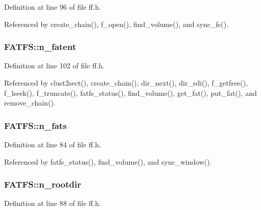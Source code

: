 Definition at line 96 of file ff.\-h.



Referenced by create\-\_\-chain(), f\-\_\-open(), find\-\_\-volume(), and sync\-\_\-fs().

\hypertarget{structFATFS_a8da50eeba6469bc20d60ca0cf9a1307c}{
\subsubsection[{n\-\_\-fatent}]{ F\-A\-T\-F\-S\-::n\-\_\-fatent}}\label{structFATFS_a8da50eeba6469bc20d60ca0cf9a1307c}


Definition at line 102 of file ff.\-h.



Referenced by clust2sect(), create\-\_\-chain(), dir\-\_\-next(), dir\-\_\-sdi(), f\-\_\-getfree(), f\-\_\-lseek(), f\-\_\-truncate(), fatfs\-\_\-status(), find\-\_\-volume(), get\-\_\-fat(), put\-\_\-fat(), and remove\-\_\-chain().

\hypertarget{structFATFS_a56716c7e7ac10cf46e73ffb2a2e9b545}{
\subsubsection[{n\-\_\-fats}]{ F\-A\-T\-F\-S\-::n\-\_\-fats}}\label{structFATFS_a56716c7e7ac10cf46e73ffb2a2e9b545}


Definition at line 84 of file ff.\-h.



Referenced by fatfs\-\_\-status(), find\-\_\-volume(), and sync\-\_\-window().

\hypertarget{structFATFS_a189a00aa038044ffad0fc7f7dcf2aae1}{
\subsubsection[{n\-\_\-rootdir}]{ F\-A\-T\-F\-S\-::n\-\_\-rootdir}}\label{structFATFS_a189a00aa038044ffad0fc7f7dcf2aae1}


Definition at line 88 of file ff.\-h.




